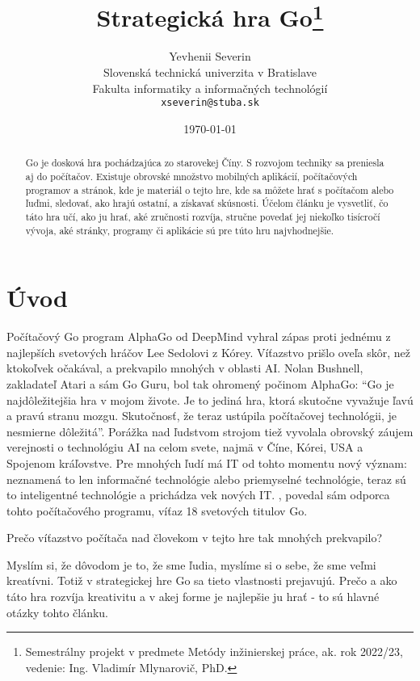 \documentclass[10pt,twoside,slovak,a4paper]{article}
\title{Strategická hra Go\thanks{Semestrálny projekt v predmete Metódy inžinierskej práce, ak. rok 2022/23, vedenie: Ing. Vladimír Mlynarovič, PhD.}}
\author{Yevhenii Severin\\[2pt]
	{\small Slovenská technická univerzita v Bratislave}\\
	{\small Fakulta informatiky a informačných technológií}\\
	{\small \texttt{xseverin@stuba.sk}}
	}
\date{\small \today}
\begin{document}
\maketitle

\begin{abstract}
Go je dosková hra pochádzajúca zo starovekej Číny. S rozvojom techniky sa preniesla aj do počítačov.
Existuje obrovské množstvo mobilných aplikácií, počítačových programov a stránok, kde je materiál o tejto hre, kde sa môžete hrať s počítačom alebo ľuďmi, sledovať, ako hrajú ostatní, a získavať skúsnosti.
Účelom článku je vysvetliť, čo táto hra učí, ako ju hrať, aké zručnosti rozvíja, stručne povedať jej niekoľko tisícročí vývoja, aké stránky, programy či aplikácie sú pre túto hru najvhodnejšie.
\end{abstract}



\section{Úvod}

Počítačový Go program AlphaGo od DeepMind vyhral zápas proti jednému z najlepších svetových hráčov Lee Sedolovi z Kórey. Víťazstvo prišlo oveľa skôr, než ktokoľvek očakával, a prekvapilo mnohých v oblasti AI. Nolan Bushnell, zakladateľ Atari a sám Go Guru, bol tak ohromený počinom AlphaGo: \enquote{Go je najdôležitejšia hra v mojom živote. Je to jediná hra, ktorá skutočne vyvažuje ľavú a pravú stranu mozgu.  Skutočnosť, že teraz ustúpila počítačovej technológii, je nesmierne dôležitá}. Porážka nad ľudstvom strojom tiež vyvolala obrovský záujem verejnosti o technológiu AI na celom svete, najmä v Číne, Kórei, USA a Spojenom kráľovstve. Pre mnohých ľudí má IT od tohto momentu nový význam: neznamená to len informačné technológie alebo priemyselné technológie, teraz sú to inteligentné technológie a prichádza vek nových IT. , povedal sám odporca tohto počítačového programu, víťaz 18 svetových titulov Go.\cite{webAlphaGo}\cite{7471613}

Prečo víťazstvo počítača nad človekom v tejto hre tak mnohých prekvapilo?

Myslím si, že dôvodom je to, že sme ľudia, myslíme si o sebe, že sme veľmi kreatívni. Totiž v strategickej hre Go sa tieto vlastnosti prejavujú. Prečo a ako táto hra rozvíja kreativitu a v akej forme je najlepšie ju hrať - to sú hlavné otázky tohto článku.
\end{document}
